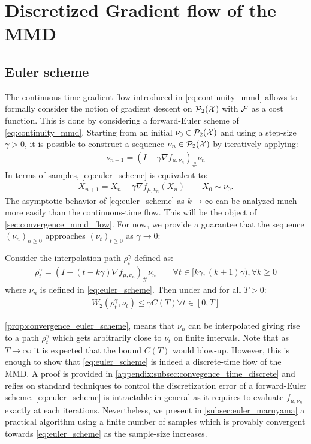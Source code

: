 \section{Discretized Gradient flow of the MMD}
\subsection{Euler scheme}
The continuous-time gradient flow introduced in \cref{eq:continuity_mmd} allows to formally consider the notion of gradient descent on $\mathcal{P}_2({{\mathcal X}})$ with ${{\mathcal F}}$ as a cost function. This is done by considering a forward-Euler scheme of \cref{eq:continuity_mmd}. Starting from an initial $\nu_0\in \mathcal{P}_2({{\mathcal X}})$ and using a step-size $\gamma>0$, it is possible to construct a sequence $\nu_n\in \mathcal{P}_2({{\mathcal X}})$ by iteratively applying:
\begin{align}\label{eq:euler_scheme}
	\nu_{n+1} = (I - \gamma \nabla f_{\mu,\nu_n})_{\#}\nu_n
\end{align} 
In terms of samples, \cref{eq:euler_scheme} is equivalent to:
\begin{align}\label{eq:euler_scheme_particles}
	X_{n+1} = X_n - \gamma \nabla f_{\mu,\nu_n}(X_n) \qquad X_0\sim \nu_0.
\end{align}
The asymptotic behavior of \cref{eq:euler_scheme} as $k\rightarrow \infty$ can be analyzed much more easily than the continuous-time flow. This will be the object of \cref{sec:convergence_mmd_flow}. For now, we provide a guarantee that the sequence $(\nu_n)_{n\geq 0}$ approaches $(\nu_t)_{t\geq 0}$ as $\gamma\rightarrow 0$:
\begin{proposition}\label{prop:convergence_euler_scheme}
	Consider the interpolation path $\rho_t^{\gamma}$ defined as:
	\begin{align}
		\rho_t^{\gamma} = (I-(t- k\gamma) \nabla f_{\mu,\nu_n})_{\#}\nu_n \qquad \forall t\in [k\gamma,(k+1)\gamma), \forall k\geq 0
	\end{align}
where $\nu_n$ is defined in \cref{eq:euler_scheme}. Then under  and for all $T>0$:
	\begin{align}
		W_2(\rho_t^{\gamma},\nu_t)\leq \gamma C(T) \forall t\in [0,T]
	\end{align}
\end{proposition} 
\cref{prop:convergence_euler_scheme}, means that $\nu_n$ can be interpolated giving rise to a path $\rho_t^{\gamma}$ which gets arbitrarily close to $\nu_t$ on finite intervals. Note that as $T \rightarrow \infty$ it is expected that the bound $C(T)$ would blow-up. However, this is enough to show that \cref{eq:euler_scheme} is indeed a discrete-time flow of the MMD. A proof is provided in \cref{appendix:subsec:convegence_time_discrete} and relies on standard techniques to control the discretization error of a forward-Euler scheme.
\cref{eq:euler_scheme} is intractable in general as it requires to evaluate $f_{\mu,\nu_n}$ exactly at each iterations. Nevertheless, we present in \cref{subsec:euler_maruyama} a practical algorithm using a finite number of samples which is provably convergent towards \cref{eq:euler_scheme} as the sample-size increases. 

